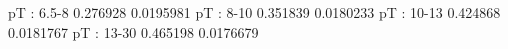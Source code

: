 pT : 6.5-8
0.276928 0.0195981
pT : 8-10
0.351839 0.0180233
pT : 10-13
0.424868 0.0181767
pT : 13-30
0.465198 0.0176679
